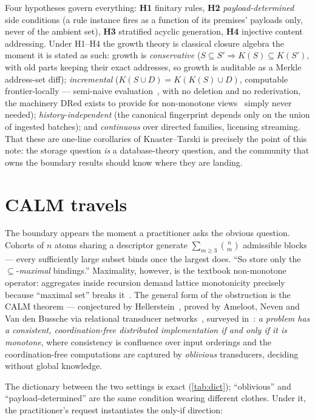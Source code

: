 \documentclass[a4paper,UKenglish,cleveref,autoref,thm-restate]{lipics-v2021}
\begin{document}
Four hypotheses govern everything: \textbf{H1} finitary rules, \textbf{H2} \emph{payload-determined} side conditions (a rule instance fires as a function of its premises' payloads only, never of the ambient set), \textbf{H3} stratified acyclic generation, \textbf{H4} injective content addressing. Under H1--H4 the growth theory is classical closure algebra the moment it is stated as such: growth is \emph{conservative} ($S \subseteq S' \Rightarrow K(S) \subseteq K(S')$, with old parts keeping their exact addresses, so growth is auditable as a Merkle address-set diff); \emph{incremental} ($K(S \cup D) = K(K(S) \cup D)$, computable frontier-locally --- semi-naive evaluation~\cite{BancilhonR86,Ullman89}, with no deletion and no rederivation, the machinery DRed exists to provide for non-monotone views~\cite{GuptaMS93} simply never needed); \emph{history-independent} (the canonical fingerprint depends only on the union of ingested batches); and \emph{continuous} over directed families, licensing streaming. That these are one-line corollaries of Knaster--Tarski is precisely the point of this note: the storage question \emph{is} a database-theory question, and the community that owns the boundary results should know where they are landing.

\section{CALM travels}

The boundary appears the moment a practitioner asks the obvious question. Cohorts of $n$ atoms sharing a descriptor generate $\sum_{m \ge 3}\binom{n}{m}$ admissible blocks --- every sufficiently large subset binds once the largest does. ``So store only the $\subseteq$-\emph{maximal} bindings.'' Maximality, however, is the textbook non-monotone operator: aggregates inside recursion demand lattice monotonicity precisely because ``maximal set'' breaks it~\cite{RossSagiv97}. The general form of the obstruction is the CALM theorem --- conjectured by Hellerstein~\cite{Hellerstein10}, proved by Ameloot, Neven and Van den Bussche via relational transducer networks~\cite{AmelootNV13}, surveyed in~\cite{HellersteinAlvaro20}: \emph{a problem has a consistent, coordination-free distributed implementation if and only if it is monotone}, where consistency is confluence over input orderings and the coordination-free computations are captured by \emph{oblivious} transducers, deciding without global knowledge.

The dictionary between the two settings is exact (\cref{tab:dict}); ``oblivious'' and ``payload-determined'' are the same condition wearing different clothes. Under it, the practitioner's request instantiates the only-if direction:
\end{document}
